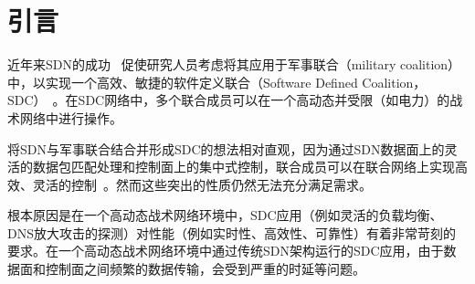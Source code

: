 \documentclass{ctexart}
\begin{document}
 
\section{引言}

近年来SDN的成功~\cite{swan, b4, edgefabric} 促使研究人员考虑将其应用于军事联合（military coalition）中，以实现一个高效、敏捷的软件定义联合（Software Defined Coalition，SDC）~\cite{vinod-sdc}。在SDC网络中，多个联合成员可以在一个高动态并受限（如电力）的战术网络中进行操作。

%

将SDN与军事联合结合并形成SDC的想法相对直观，因为通过SDN数据面上的灵活的数据包匹配处理和控制面上的集中式控制，联合成员可以在联合网络上实现高效、灵活的控制~\cite{p4, rmt}。然而这些突出的性质仍然无法充分满足需求。


根本原因是在一个高动态战术网络环境中，SDC应用（例如灵活的负载均衡、DNS放大攻击的探测）对性能（例如实时性、高效性、可靠性）有着非常苛刻的要求。在一个高动态战术网络环境中通过传统SDN架构运行的SDC应用，由于数据面和控制面之间频繁的数据传输，会受到严重的时延等问题。

\end{document}
